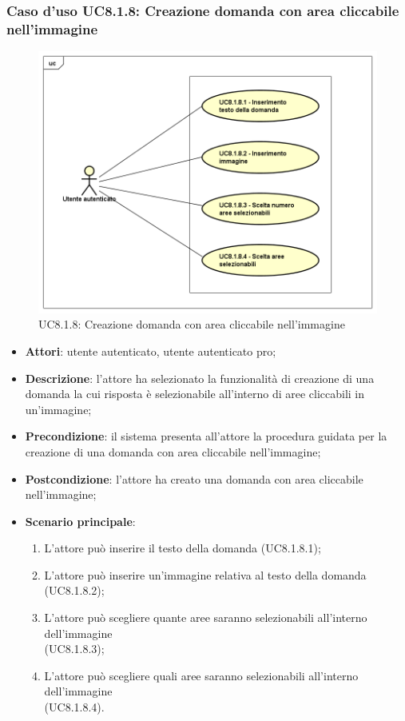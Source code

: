 \subsubsection{Caso d'uso UC8.1.8: Creazione domanda con area cliccabile nell'immagine}
\label{UC8.1.8}
\begin{figure}[h]
	\centering
	\includegraphics[scale=0.5,keepaspectratio]{UML/UC8_1_8.png}
	\caption{UC8.1.8: Creazione domanda con area cliccabile nell'immagine}
\end{figure}
\FloatBarrier
\begin{itemize}
	\item \textbf{Attori}: utente autenticato, utente autenticato pro;
	\item \textbf{Descrizione}: l'attore ha selezionato la funzionalità di creazione di una domanda la cui risposta è selezionabile all'interno di aree cliccabili in un'immagine;
	\item \textbf{Precondizione}: il sistema presenta all'attore la procedura guidata per la creazione di una domanda con area cliccabile nell'immagine;
	\item \textbf{Postcondizione}: l'attore ha creato una domanda con area cliccabile nell'immagine;
	\item \textbf{Scenario principale}:
		\begin{enumerate}
	       	\item L'attore può inserire il testo della domanda (UC8.1.8.1);
	        \item L'attore può inserire un'immagine relativa al testo della domanda (UC8.1.8.2);
		\item L'attore può scegliere quante aree saranno selezionabili all'interno dell'immagine \\(UC8.1.8.3);
		\item L'attore può scegliere quali aree saranno selezionabili all'interno dell'immagine \\(UC8.1.8.4).
	 	\end{enumerate}
\end{itemize}

